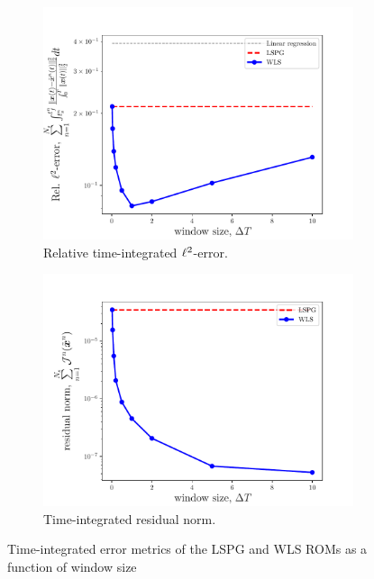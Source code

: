 \begin{figure}
\begin{center}
\begin{subfigure}[t]{0.49\textwidth}
\includegraphics[trim={0cm 0cm 0cm 0cm},clip,width=1.0\linewidth]{figs/swe/swe_windowSize_vs_error_K83.pdf}
\caption{Relative time-integrated $\ell^2$-error.}
\end{subfigure}
\begin{subfigure}[t]{0.49\textwidth}
\includegraphics[trim={0cm 0cm 0cm 0cm},clip,width=1.0\linewidth]{figs/swe/swe_windowSize_vs_residual_K83.pdf}
\caption{Time-integrated residual norm.}
\end{subfigure}
\caption{Time-integrated error metrics of the LSPG and WLS ROMs as a function of window size} 
\label{fig:rom_swe_metrics}
\end{center}
\end{figure}

